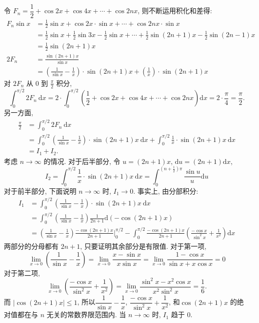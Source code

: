 令 $F_n = \dfrac{1}{2} + \cos 2x + \cos 4x + \cdots + \cos 2nx$, 则不断运用积化和差得: 
\begin{align*}
F_n\sin x &= \frac{1}{2}\sin x+\cos 2x\cdot\sin x + \cdots + \cos 2nx\cdot\sin x\\
&= \frac{1}{2}\sin x + \frac{1}{2}\sin 3x - \frac{1}{2}\sin x + \cdots + \frac{1}{2}\sin (2n+1)x - \frac{1}{2}\sin (2n-1)x\\
&= \frac{1}{2}\sin (2n+1)x\\
2F_n &= \frac{\sin(2n+1)x}{\sin x} \\
&= \left(\frac{1}{\sin x} - \frac{1}{x}\right)\cdot\sin (2n+1)x + \left(\frac{1}{x}\right)\cdot\sin(2n+1)x
\end{align*}
对 $2F_n$ 从 $0$ 到 $\frac{\pi}{2}$ 积分, 
\[\int_0^{\pi/2} 2F_n\ \mathrm{d}x = 2\cdot\int_0^{\pi/2}\left(\frac{1}{2}+\cos 2x + \cos 4x + \cdots + \cos 2nx\right)\mathrm{d}x = 2\cdot\frac{\pi}{4} = \frac{\pi}{2} .\]
另一方面, 
\begin{align*}
\frac{\pi}{2} &= \int_0^{\pi/2} 2F_n\ \mathrm{d}x \\
&= \int_0^{\pi/2}\left(\frac{1}{\sin x} - \frac{1}{x}\right)\cdot\sin (2n+1)x\ \mathrm{d}x + \int_0^{\pi/2} \frac{1}{x}\cdot\sin(2n+1)x\ \mathrm{d}x\\
&= I_1 + I_2 .
\end{align*}
考虑 $n\to\infty$ 的情况. 对于后半部分, 令 $u = (2n+1)x$, $\mathrm{d}u = (2n+1)\mathrm{d}x$, 
\[I_2 = \int_0^{\pi/2} \frac{1}{x}\cdot\sin(2n+1)x\ \mathrm{d}x = \int_0^{(n+\frac{1}{2})\pi} \frac{\sin u}{u}\mathrm{d}u \]
对于前半部分, 下面说明 $n\to\infty$ 时, $I_1\to 0$. 事实上, 由分部积分:
\begin{align*}
I_1 &= \int_0^{\pi/2}\left(\frac{1}{\sin x} - \frac{1}{x}\right)\cdot\sin (2n+1)x\ \mathrm{d}x \\
&= \int_0^{\pi/2}\left(\frac{1}{\sin x} - \frac{1}{x}\right)\frac{1}{2n+1}\mathrm{d}(-\cos(2n+1)x)\\
&= \left(\frac{1}{\sin x} - \frac{1}{x}\right)\frac{-\cos(2n+1)x}{2n+1}\bigg|_0^{\pi/2} - \int_0^{\pi/2}\frac{-\cos(2n+1)x}{2n+1}\left(\frac{-\cos x}{\sin^2 x}+\frac{1}{x^2}\right)\mathrm{d}x
\end{align*}
两部分的分母都有 $2n+1$, 只要证明其余部分是有限值. 对于第一项, 
\[\lim_{x\to 0}\left(\frac{1}{\sin x} - \frac{1}{x}\right) = \lim_{x\to 0}\frac{x - \sin x}{x\sin x} = \lim_{x\to 0}\frac{1-\cos x}{\sin x + x\cos x} = 0\]
对于第二项, 
\[\lim_{x\to 0}\left(\frac{-\cos x}{\sin^2 x}+\frac{1}{x^2}\right) = \lim_{x\to 0}\frac{\sin^2 x-x^2\cos x}{x^2\sin^2 x} = \frac{1}{6} .\]
而 $|\cos(2n+1)x| \le 1$, 所以$\dfrac{1}{\sin x} - \dfrac{1}{x}$, $\dfrac{-\cos x}{\sin^2 x}+\dfrac{1}{x^2}$, 和$\cos(2n+1)x$ 的绝对值都在与 $n$ 无关的常数界限范围内. 当 $n\to\infty$ 时, $I_1$ 趋于 $0$.

